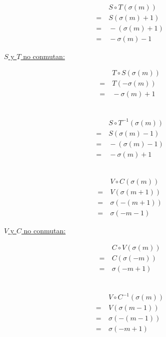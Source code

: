			\begin{center}
			\begin{multicols}{3}
				\ \linebreak
				\begin{align*}
				&\ S\circ T(\sigma(m))\\
				=&\ S(\sigma(m)+1)\\
				=&\ -(\sigma(m)+1)\\
				=&\ -\sigma(m)-1
				\end{align*}
				
				\underline{$S$ y $T$ no conmutan:}
				
				\begin{align*}
				&\ T\circ S(\sigma(m))\\
				=&\ T(-\sigma(m))\\
				=&\ -\sigma(m)+1
				\end{align*}			
				
				\ \linebreak				
				\begin{align*}
				&\ S\circ T^{-1}(\sigma(m))\\
				=&\ S(\sigma(m)-1)\\
				=&\ -(\sigma(m)-1)\\
				=&\ -\sigma(m)+1
				\end{align*}
			\end{multicols}
			
			\begin{multicols}{3}
				\ \linebreak				
				\begin{align*}
				&\ V\circ C(\sigma(m))\\
				=&\ V(\sigma(m+1))\\
				=&\ \sigma(-(m+1))\\
				=&\ \sigma(-m-1)
				\end{align*}
				
				\underline{$V$ y $C$ no conmutan:}
				
				\begin{align*}
				&\ C\circ V(\sigma(m))\\
				=&\ C(\sigma(-m))\\
				=&\ \sigma(-m+1)
				\end{align*}
				
				\ \linebreak
				\begin{align*}
				&\ V\circ C^{-1}(\sigma(m))\\
				=&\ V(\sigma(m-1))\\
				=&\ \sigma(-(m-1))\\
				=&\ \sigma(-m+1)
				\end{align*}
			\end{multicols}
			

\end{center}
